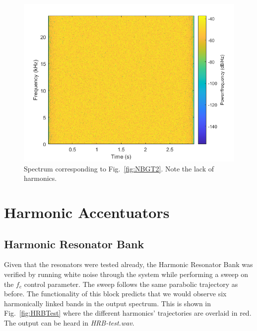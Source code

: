 \documentclass[../main.tex]{subfiles}
\begin{document}
\begin{figure}[hb]
    \centering
    \includegraphics[scale=.65]{./images/plots/NBGTest2Spectrum.png}
    \caption{Spectrum corresponding to Fig.~\ref{fig:NBGT2}. Note the lack of harmonics.}
    \label{fig:NBGT2Spec}
\end{figure}

\clearpage

\section{Harmonic Accentuators}
\subsection{Harmonic Resonator Bank}
Given that the resonators were tested already, the Harmonic Resonator Bank was verified by running white noise through the system while performing a sweep on the $f_c$ control parameter. The sweep follows the same parabolic trajectory as before. The functionality of this block predicts that we would observe six harmonically linked bands in the output spectrum. This is shown in Fig.~\ref{fig:HRBTest} where the different harmonics' trajectories are overlaid in red. The output can be heard in \emph{HRB-test.wav}.
\end{document}
